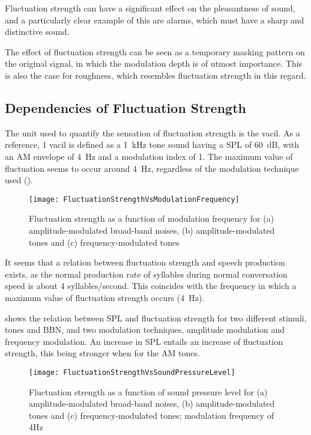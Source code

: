 \documentclass[../main.tex]{subfiles}
\begin{document}
\begin{theoreticalbackground}
Fluctuation strength can have a significant effect on the pleasantness of sound,
and a particularly clear example of this are alarms, which must have a sharp and
distinctive sound.

The effect of fluctuation strength can be seen as a temporary masking pattern on
the original signal, in which the modulation depth is of utmost importance. This
is also the case for roughness, which resembles fluctuation strength in this
regard.

\subsection{Dependencies of Fluctuation Strength}

The unit used to quantify the sensation of fluctuation strength is the vacil. As
a reference, 1 vacil is defined as a 1~kHz tone sound having a \gls{SPL} of
60~dB, with an \gls{AM} envelope of 4~Hz and a modulation index of 1. The
maximum value of fluctuation seems to occur around 4~Hz, regardless of the
modulation technique used ().

\begin{figure}[!ht]
  \centering
  \texttt{[image: FluctuationStrengthVsModulationFrequency]}
  \caption{Fluctuation strength as a function of modulation frequency for (a)
    amplitude-modulated broad-band noises, (b) amplitude-modulated tones and (c)
    frequency-modulated tones~\cite[pp.~248]{Fastl2007Psychoacoustics}}
\label{fig:flucstrenvmodfreq}
\end{figure}

It seems that a relation between fluctuation strength and speech production
exists, as the normal production rate of syllables during normal conversation
speed is about 4 syllables/second. This coincides with the frequency in which a
maximum value of fluctuation strength occurs (4~Hz).

 shows the relation between \gls{SPL} and
fluctuation strength for two different stimuli, tones and \gls{BBN}, and two
modulation techniques, amplitude modulation and frequency modulation. An
increase in \gls{SPL} entails an increase of fluctuation strength, this being
stronger when for the \gls{AM} tones.

\begin{figure}[!ht]
  \centering
  \texttt{[image: FluctuationStrengthVsSoundPressureLevel]}
  \caption{Fluctuation strength as a function of sound pressure level for (a)
    amplitude-modulated broad-band noises, (b) amplitude-modulated tones and (c)
    frequency-modulated tones; modulation frequency of
    4Hz~\cite[pp.~249]{Fastl2007Psychoacoustics}}
\label{fig:flucstrenvsndpreslvl}
\end{figure}


\end{theoreticalbackground}
\end{document}
